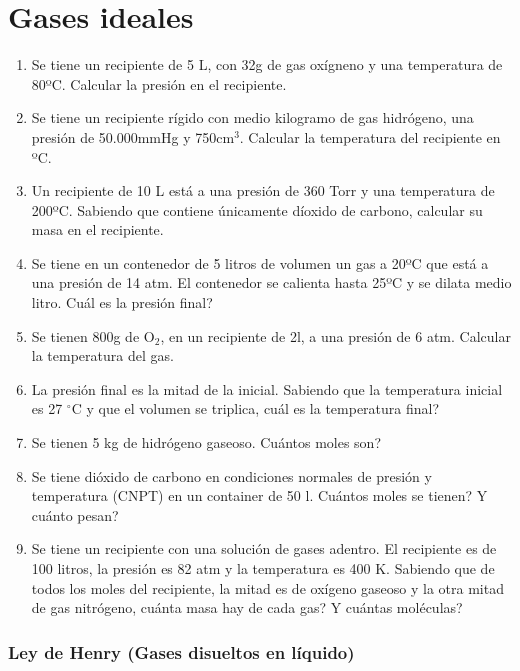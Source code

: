 \section{Gases ideales}

\begin{enumerate}

\item Se tiene un recipiente de 5 L, con 32g de gas oxígneno y una temperatura de 80ºC. Calcular la presión en el recipiente.

\item Se tiene un recipiente rígido con medio kilogramo de gas hidrógeno, una presión de 50.000mmHg y 750cm$^3$. Calcular la temperatura del recipiente en ºC.

\item Un recipiente de 10 L está a una presión de 360 Torr y una temperatura de 200ºC. Sabiendo que contiene únicamente díoxido de carbono, calcular su masa en el recipiente. 

\item Se tiene en un contenedor de 5 litros de volumen un gas a 20ºC que está a una presión de 14 atm. El contenedor se calienta hasta 25ºC y se dilata medio litro. Cuál es la presión final?

\item Se tienen 800g de O$_2$, en un recipiente de 2l, a una presión de 6 atm. Calcular la temperatura del gas.

\item La presión final es la mitad de la inicial. Sabiendo que la temperatura inicial es 27 $^\circ$C y que el volumen se triplica, cuál es la temperatura final?

\item Se tienen 5 kg de hidrógeno gaseoso. Cuántos moles son?

\item Se tiene dióxido de carbono en condiciones normales de presión y temperatura (CNPT) en un container de 50 l. Cuántos moles se tienen? Y cuánto pesan?

\item Se tiene un recipiente con una solución de gases adentro. El recipiente es de 100 litros, la presión es 82 atm y la temperatura es 400 K. Sabiendo que de todos los moles del recipiente, la mitad es de oxígeno gaseoso y la otra mitad de gas nitrógeno, cuánta masa hay de cada gas? Y cuántas moléculas?
\end{enumerate}


\subsubsection*{Ley de Henry (Gases disueltos en líquido)}


